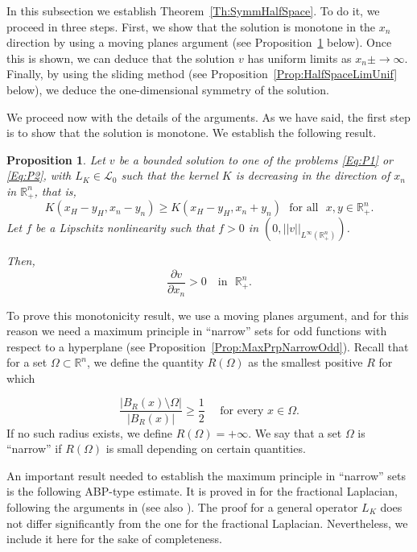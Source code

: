 \documentclass[12pt,reqno]{amsart}
\newtheorem{proposition}[theorem]{Proposition}
\theoremstyle{definition}
\theoremstyle{remark}
\newcommand{\con}[1]{\mathbb{#1}}
\newcommand{\R}{\con{R}} %
\newcommand{\lcal}{\mathcal{L}}
\numberwithin{equation}{section}
\begin{document}
In this subsection we establish Theorem~\ref{Th:SymmHalfSpace}. To do it, we proceed in three steps. First, we show that the solution is monotone in the $x_n$ direction by using a moving planes argument (see Proposition~\ref{Prop:MonotonyHalfSpace} below). Once this is shown, we can deduce that the solution $v$ has uniform limits as $x_n\pm\to \infty$. Finally, by using the sliding method (see Proposition~\ref{Prop:HalfSpaceLimUnif} below), we deduce the one-dimensional symmetry of the solution.

We proceed now with the details of the arguments. As we have said, the first step is to show that the solution is monotone. We establish the following result.

\begin{proposition}
	\label{Prop:MonotonyHalfSpace}
	Let $v$ be a bounded solution to one of the problems \eqref{Eq:P1} or \eqref{Eq:P2}, with $L_K \in \lcal_0$ such that the kernel $K$ is decreasing in the direction of $x_n$ in $\R^n_+$, that is, 
	$$
	K(x_H-y_H,x_n-y_n) \geq K(x_H-y_H,x_n+y_n) \,\,\,\,\text{for all } \,\, x,y\in \R^n_+.
	$$
	Let $f$ be a Lipschitz nonlinearity such that $f>0$ in $(0,||v||_{L^\infty(\R^n_+)})$. 
	
	Then,
	$$
	\frac{\partial v}{\partial x_n} > 0 \,\,\,\, \text{ in } \,\,\R^n_+.
	$$
\end{proposition}

To prove this monotonicity result, we use a moving planes argument, and for this reason we need a maximum principle in ``narrow'' sets for odd functions with respect to a hyperplane (see Proposition~\ref{Prop:MaxPrpNarrowOdd}). Recall that for a set $\Omega \subset \R^n$, we define the quantity $R(\Omega)$ as the smallest positive $R$ for which

\begin{equation}
\label{Eq:DefNarrow}
\dfrac{|B_R(x)\setminus \Omega|}{|B_R(x)|}\geq \dfrac{1}{2} \quad \text{ for every } x \in \Omega.
\end{equation}
If no such radius exists, we define $R(\Omega) = +\infty$. We say that a set $\Omega$ is ``narrow'' if $R(\Omega)$ is small depending on certain quantities.

An important result needed to establish the maximum principle in ``narrow'' sets is the following ABP-type estimate. It is proved in \cite{QuaasXia} for the fractional Laplacian, following the arguments in \cite{Cabre-ABP} (see also \cite{Cabre-Topics}). The proof for a general operator $L_K$ does not differ significantly from the one for the fractional Laplacian. Nevertheless, we include it here for the sake of completeness.
\end{document}
